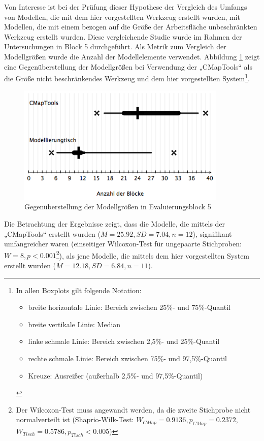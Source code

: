 Von Interesse ist bei der Prüfung dieser Hypothese der Vergleich des Umfangs von Modellen, die mit dem hier vorgestellten Werkzeug erstellt wurden, mit Modellen, die mit einem bezogen auf die Größe der Arbeitsfläche unbeschränkten Werkzeug erstellt wurden. Diese vergleichende Studie wurde im Rahmen der Untersuchungen in Block 5 durchgeführt. Als Metrik zum Vergleich der Modellgrößen wurde die Anzahl der Modellelemente verwendet. Abbildung \ref{fig:img_Evaluierung_ElementeConceptMapping2} zeigt eine Gegenüberstellung der Modellgrößen bei Verwendung der „CMapTools“ als die Größe nicht beschränkendes Werkzeug und dem hier vorgestellten System\footnote{In allen Boxplots gilt folgende Notation: 
\begin{itemize}
	\item breite horizontale Linie: Bereich zwischen 25\%- und 75\%-Quantil
	\item breite vertikale Linie: Median
	\item linke schmale Linie: Bereich zwischen 2,5\%- und 25\%-Quantil
	\item rechte schmale Linie: Bereich zwischen 75\%- und 97,5\%-Quantil
	\item Kreuze: Ausreißer (außerhalb 2,5\%- und 97,5\%-Quantil)
\end{itemize}
}.

\begin{figure}[htbp]
	\centering
		\includegraphics[width=10cm]{img/Evaluierung/ElementeConceptMapping2.png}
	\caption{Gegenüberstellung der Modellgrößen in Evaluierungsblock 5}
	\label{fig:img_Evaluierung_ElementeConceptMapping2}
\end{figure}

Die Betrachtung der Ergebnisse zeigt, dass die Modelle, die mittels der „CMapTools“ erstellt wurden ($M=25.92, SD=7.04, n=12$), signifikant umfangreicher waren (einseitiger Wilcoxon-Test für ungepaarte Stichproben: $W=8, p<0.001$\footnote{Der Wilcoxon-Test muss angewandt werden, da die zweite Stichprobe nicht normalverteilt ist (Shaprio-Wilk-Test: $W_{CMap} = 0.9136, p_{CMap} = 0.2372$, $W_{Tisch} = 0.5786, p_{Tisch} < 0.005$)}), als jene Modelle, die mittels dem hier vorgestellten System erstellt wurden ($M=12.18, SD=6.84, n=11$).


